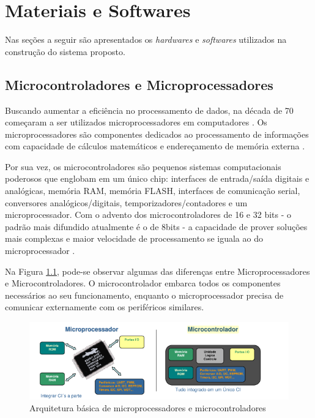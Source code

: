 \chapter{Materiais e Softwares}
Nas seções a seguir são apresentados os \textit{hardwares} e \textit{softwares} utilizados na construção do sistema proposto.
\section{Microcontroladores e Microprocessadores}

Buscando aumentar a eficiência no processamento de dados, na década de 70
começaram a ser utilizados microprocessadores em computadores \cite{martins2005sistemas}. Os microprocessadores são componentes dedicados ao processamento de informações com
capacidade de cálculos matemáticos e endereçamento de memória externa \cite{chase2007sistemas}.

Por sua vez, os microcontroladores são pequenos sistemas computacionais poderosos que englobam em um único chip: interfaces de entrada/saída digitais e analógicas, memória RAM, memória FLASH, interfaces de comunicação serial, conversores analógicos/digitais, temporizadores/contadores e um microprocessador. Com o advento dos microcontroladores de 16 e 32 bits - o padrão mais difundido atualmente é o de 8bits - a capacidade de prover soluções mais complexas e maior velocidade de processamento se iguala ao do microprocessador \cite{chase2007sistemas}.

Na Figura \ref{fig:microprocessador-microcontrolador}, pode-se observar algumas das diferenças entre Microprocessadores e Microcontroladores. O microcontrolador embarca todos os componentes necessários ao seu funcionamento, enquanto o microprocessador precisa de comunicar externamente com os periféricos similares.

\begin{figure}[htbp]
	\centering
	\includegraphics[scale=0.7]{figuras/processa-controla.png}
	\caption{Arquitetura básica de microprocessadores e microcontroladores}
	\label{fig:microprocessador-microcontrolador}
\end{figure}


